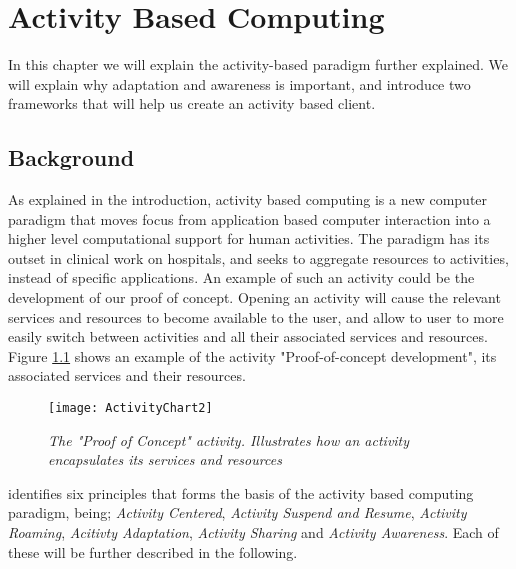 \chapter{Activity Based Computing}

In this chapter we will explain the activity-based paradigm further explained. We will explain why adaptation and awareness is important, and introduce two frameworks that will help us create an activity based client.

\section{Background}
As explained in the introduction, activity based computing is a new computer paradigm that moves focus from application based computer interaction into a higher level computational support for human activities. The paradigm has its outset in clinical work on hospitals, and seeks to aggregate resources to activities, instead of specific applications. An example of such an activity could be the development of our proof of concept. Opening an activity will cause the relevant services and resources to become available to the user, and allow to user to more easily switch between activities and all their associated services and resources. Figure \ref{fig:activitychart} shows an example of the activity "Proof-of-concept development", its associated services and their resources.

\begin{figure}[h!]
  \centering
    \texttt{[image: ActivityChart2]}
  \caption{\emph{The "Proof of Concept" activity. Illustrates how an activity encapsulates its services and resources}}
  \label{fig:activitychart}
\end{figure}

\citet{bardram2011} identifies six principles that forms the basis of the activity based computing paradigm, being; \emph{Activity Centered}, \emph{Activity Suspend and Resume}, \emph{Activity Roaming}, \emph{Acitivty Adaptation}, \emph{Activity Sharing} and \emph{Activity Awareness}. Each of these will be further described in the following.

